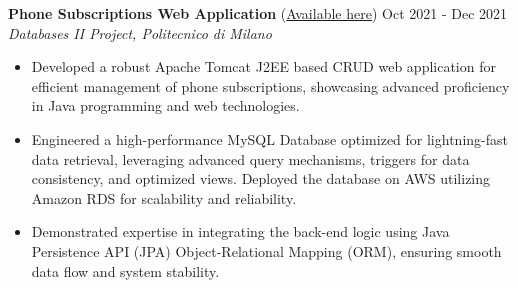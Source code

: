 
\noindent
\textbf{Phone Subscriptions Web Application} (\href{https://github.com/GiuseppeCalderonio/DataBase2}{Available here}) \hfill Oct 2021 - Dec 2021 \\
\textit{Databases II Project, Politecnico di Milano}
\begin{itemize}[noitemsep,topsep=0pt]
    \item Developed a robust Apache Tomcat J2EE based CRUD web application for efficient management of phone subscriptions, showcasing advanced proficiency in Java programming and web technologies.
    \item Engineered a high-performance MySQL Database optimized for lightning-fast data retrieval, leveraging advanced query mechanisms, triggers for data consistency, and optimized views. Deployed the database on AWS utilizing Amazon RDS for scalability and reliability.
    \item Demonstrated expertise in integrating the back-end logic using Java Persistence API (JPA) Object-Relational Mapping (ORM), ensuring smooth data flow and system stability.
\end{itemize}

